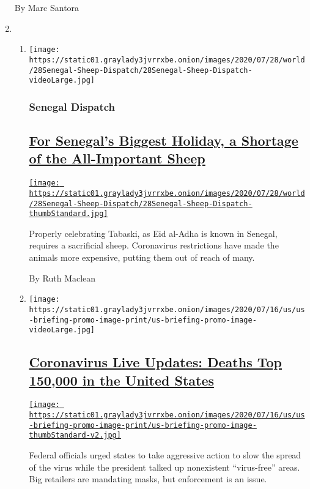 \begin{enumerate}
  By Marc Santora
\item
  \begin{enumerate}
  \def\labelenumii{\arabic{enumii}.}
  \item
    \texttt{[image: https://static01.graylady3jvrrxbe.onion/images/2020/07/28/world/28Senegal-Sheep-Dispatch/28Senegal-Sheep-Dispatch-videoLarge.jpg]}

    \hypertarget{senegal-dispatch}{%
    \subsubsection{Senegal Dispatch}\label{senegal-dispatch}}

    \hypertarget{for-senegals-biggest-holiday-a-shortage-of-the-all-important-sheep}{%
    \subsection{\texorpdfstring{\href{/2020/07/29/world/africa/senegal-tabaski-sheep-eid-adha.html}{For
    Senegal's Biggest Holiday, a Shortage of the All-Important
    Sheep}}{For Senegal's Biggest Holiday, a Shortage of the All-Important Sheep}}\label{for-senegals-biggest-holiday-a-shortage-of-the-all-important-sheep}}

    \href{/2020/07/29/world/africa/senegal-tabaski-sheep-eid-adha.html}{\texttt{[image: https://static01.graylady3jvrrxbe.onion/images/2020/07/28/world/28Senegal-Sheep-Dispatch/28Senegal-Sheep-Dispatch-thumbStandard.jpg]}}

    Properly celebrating Tabaski, as Eid al-Adha is known in Senegal,
    requires a sacrificial sheep. Coronavirus restrictions have made the
    animals more expensive, putting them out of reach of many.

    By Ruth Maclean
  \item
    \texttt{[image: https://static01.graylady3jvrrxbe.onion/images/2020/07/16/us/us-briefing-promo-image-print/us-briefing-promo-image-videoLarge.jpg]}

    \hypertarget{coronavirus-live-updates-deaths-top-150000-in-the-united-states}{%
    \subsection{\texorpdfstring{\href{/2020/07/29/world/coronavirus-covid-19.html}{Coronavirus
    Live Updates: Deaths Top 150,000 in the United
    States}}{Coronavirus Live Updates: Deaths Top 150,000 in the United States}}\label{coronavirus-live-updates-deaths-top-150000-in-the-united-states}}

    \href{/2020/07/29/world/coronavirus-covid-19.html}{\texttt{[image: https://static01.graylady3jvrrxbe.onion/images/2020/07/16/us/us-briefing-promo-image-print/us-briefing-promo-image-thumbStandard-v2.jpg]}}

    Federal officials urged states to take aggressive action to slow the
    spread of the virus while the president talked up nonexistent
    ``virus-free'' areas. Big retailers are mandating masks, but
    enforcement is an issue.
  \end{enumerate}
\end{enumerate}


